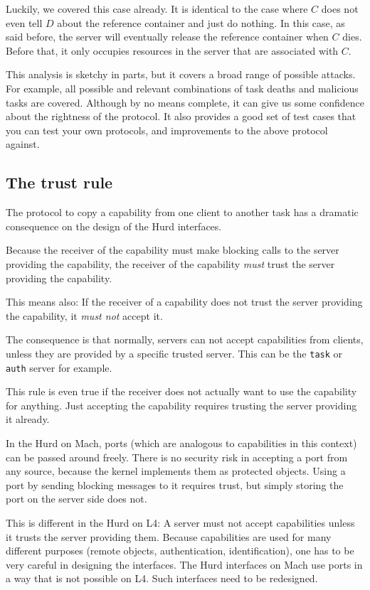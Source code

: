 Luckily, we covered this case already.  It is identical to the case
where $C$ does not even tell $D$ about the reference container and
just do nothing.  In this case, as said before, the server will
eventually release the reference container when $C$ dies.  Before
that, it only occupies resources in the server that are associated
with $C$.

This analysis is sketchy in parts, but it covers a broad range of
possible attacks.  For example, all possible and relevant combinations
of task deaths and malicious tasks are covered.  Although by no means
complete, it can give us some confidence about the rightness of the
protocol.  It also provides a good set of test cases that you can test
your own protocols, and improvements to the above protocol against.


\subsection{The trust rule}

The protocol to copy a capability from one client to another task has
a dramatic consequence on the design of the Hurd interfaces.

Because the receiver of the capability must make blocking calls to the
server providing the capability, the receiver of the capability
\emph{must} trust the server providing the capability.

This means also: If the receiver of a capability does not trust the
server providing the capability, it \emph{must not} accept it.

The consequence is that normally, servers can not accept capabilities
from clients, unless they are provided by a specific trusted server.
This can be the \texttt{task} or \texttt{auth} server for example.

This rule is even true if the receiver does not actually want to use
the capability for anything.  Just accepting the capability requires
trusting the server providing it already.

In the Hurd on Mach, ports (which are analogous to capabilities in
this context) can be passed around freely.  There is no security risk
in accepting a port from any source, because the kernel implements
them as protected objects.  Using a port by sending blocking messages
to it requires trust, but simply storing the port on the server side
does not.

This is different in the Hurd on L4: A server must not accept
capabilities unless it trusts the server providing them.  Because
capabilities are used for many different purposes (remote objects,
authentication, identification), one has to be very careful in
designing the interfaces.  The Hurd interfaces on Mach use ports in a
way that is not possible on L4.  Such interfaces need to be
redesigned.

